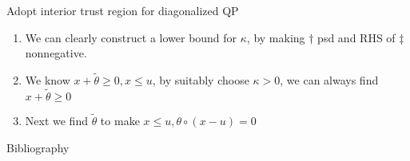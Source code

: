 \documentclass{beamerswitch}
\begin{document}
\begin{frame}[allowframebreaks]{Adopt interior trust region for diagonalized QP}
  \begin{enumerate}
    \item We can clearly construct a lower bound for \(\kappa\), by making \(\dagger\) psd and RHS of \(\ddagger\) nonnegative.
    \item We know \(x + \tilde \theta \ge 0, x\le u \), by suitably choose \(\kappa > 0\), we can always find \(x + \tilde \theta \ge 0\)
    \item Next we find \(\tilde \theta \) to make \(x \le u, \theta \circ (x - u) = 0\)
  \end{enumerate}
\end{frame}


\begin{frame}[allowframebreaks]{Bibliography}
  
  
\end{frame}
\end{document}
